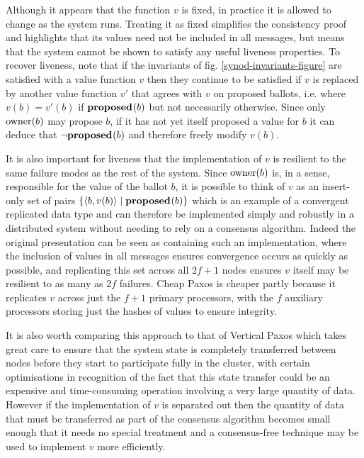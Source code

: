 \documentclass[journal]{IEEEtran}
\begin{document}
Although it appears that the function $v$ is fixed, in practice it is allowed
to change as the system runs. Treating it as fixed simplifies the consistency
proof and highlights that its values need not be included in all messages, but
means that the system cannot be shown to satisfy any useful liveness
properties.  To recover liveness, note that if the invariants of fig.
\ref{synod-invariants-figure} are satisfied with a value function $v$ then they
continue to be satisfied if $v$ is replaced by another value function $v'$ that
agrees with $v$ on proposed ballots, i.e. where $v(b) = v'(b)$ if $\mathbf{proposed}_{}(b)$
but not necessarily otherwise. Since only $\mathrm{owner}(b)$ may propose $b$, if it
has not yet itself proposed a value for $b$ it can deduce that $\neg\mathbf{proposed}_{}(b)$
and therefore freely modify $v(b)$.

It is also important for liveness that the implementation of $v$ is resilient
to the same failure modes as the rest of the system. Since $\mathrm{owner}(b)$ is, in a
sense, responsible for the value of the ballot $b$, it is possible to think of
$v$ as an insert-only set of pairs ${\{ \langle b, v(b) \rangle \mid \mathbf{proposed}_{}(b)
\}}$ which is an example of a convergent replicated data type\cite{crdts} and
can therefore be implemented simply and robustly in a distributed system
without needing to rely on a consensus algorithm.  Indeed the original
presentation can be seen as containing such an implementation, where the
inclusion of values in all messages ensures convergence occurs as quickly as
possible, and replicating this set across all ${2f+1}$ nodes ensures $v$ itself
may be resilient to as many as $2f$ failures.  Cheap Paxos\cite{cheap-paxos} is
cheaper partly because it replicates $v$ across just the ${f+1}$ primary
processors, with the $f$ auxiliary processors storing just the hashes of values
to ensure integrity.

It is also worth comparing this approach to that of Vertical
Paxos\cite{vertical-paxos} which takes great care to ensure that the system
state is completely transferred between nodes before they start to participate
fully in the cluster, with certain optimisations in recognition of the fact
that this state transfer could be an expensive and time-consuming operation
involving a very large quantity of data. However if the implementation of $v$
is separated out then the quantity of data that must be transferred as part of
the consensus algorithm becomes small enough that it needs no special treatment
and a consensus-free technique may be used to implement $v$ more efficiently.
\end{document}
